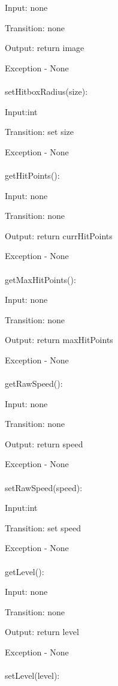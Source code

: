 \documentclass[12,english]{article}
\begin{document}
		    Input: none
		     
		    Transition: none
		    
		    Output: return image
		     
		    Exception - None\\  
		    \\
		setHitboxRadius(size):
		
		    Input:int
		     
		    Transition: set size
		   
		     
		    Exception - None\\  
		    \\
		getHitPoints():
		
		    Input: none
		     
		    Transition: none
		    
		    Output: return currHitPoints
		     
		    Exception - None\\  
		    \\
		getMaxHitPoints():
		
		    Input: none
		     
		    Transition: none
		    
		    Output: return maxHitPoints
		     
		    Exception - None\\  
		    \\
		getRawSpeed():
		
		    Input: none
		     
		    Transition: none
		    
		    Output: return speed
		     
		    Exception - None\\  
		    \\
		setRawSpeed(speed):
		
		    Input:int
		     
		    Transition: set speed
		   
		     
		    Exception - None\\  
		    \\
		getLevel():
		
		    Input: none
		     
		    Transition: none
		    
		    Output: return level
		     
		    Exception - None\\  
		    \\
	    setLevel(level):
		
\end{document}
